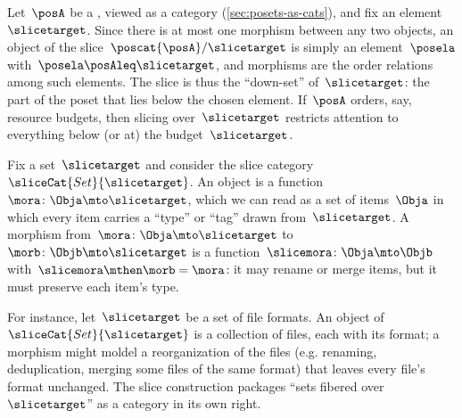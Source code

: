 
\begin{example}
    \label{exa:slice-poset}
    Let~$\posA$ be a , viewed as a category (\cref{sec:posets-as-cats}), and fix an element~$\slicetarget$.
    Since there is at most one morphism between any two objects, an object of the slice~$\poscat{\posA} / \slicetarget$ is simply an element~$\posela$ with~$\posela \posAleq \slicetarget$, and morphisms are the order relations among such elements.
    The slice is thus the ``down-set'' of~$\slicetarget$: the part of the poset that lies below the chosen element.
    If~$\posA$ orders, say, resource budgets, then slicing over~$\slicetarget$ restricts attention to everything below (or at) the budget~$\slicetarget$. 
    \end{example}

\begin{example}
    \label{exa:slice-set-typed}
    Fix a set~$\slicetarget$ and consider the slice category~$\sliceCat{Set}{\slicetarget}$.
    An object is a function~$\mora \colon \Obja \mto \slicetarget$, which we can read as a set of items~$\Obja$ in which every item carries a ``type'' or ``tag'' drawn from~$\slicetarget$.
    A morphism from~$\mora \colon \Obja \mto \slicetarget$ to~$\morb \colon \Objb \mto \slicetarget$ is a function~$\slicemora \colon \Obja \mto \Objb$ with~$\slicemora \mthen \morb = \mora$: it may rename or merge items, but it must preserve each item's type.

    For instance, let~$\slicetarget$ be a set of file formats.
    An object of~$\sliceCat{Set}{\slicetarget}$ is a collection of files, each with its format; a morphism might moldel a reorganization of the files (e.g. renaming, deduplication, merging some files of the same format) that leaves every file's format unchanged.
    The slice construction packages ``sets fibered over~$\slicetarget$'' as a category in its own right.
\end{example}

